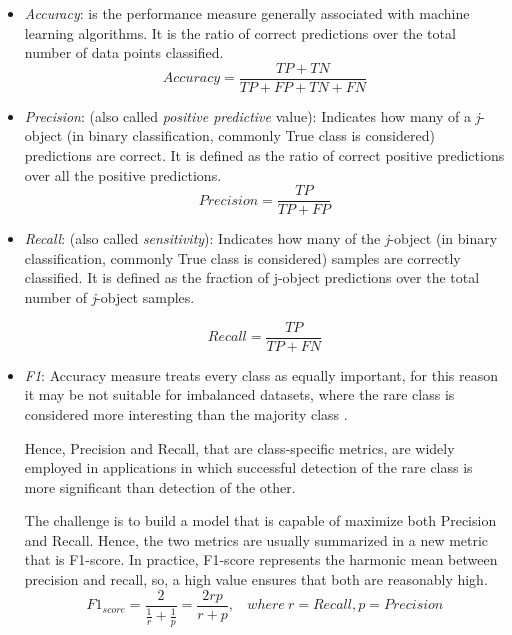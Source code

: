 \documentclass{article}
\begin{document}
\begin{itemize}
    \item \emph{Accuracy}: is the performance measure generally associated with machine learning algorithms. It is the ratio of correct predictions over the total number of data points classified. 
    \begin{equation}
    Accuracy = \frac{TP + TN}{TP + FP + TN + FN}
    \end{equation}
    
    \item \emph{Precision}: (also called \emph{positive predictive} value): Indicates how many of a \emph{j}-object (in binary classification, commonly True class is considered) predictions are correct. It is defined as the ratio of correct positive predictions over all the positive predictions.
    \begin{equation}
    Precision = \frac{TP}{TP + FP}
    \end{equation}
    
    \item \emph{Recall}: (also called \emph{sensitivity}): Indicates how many of the \emph{j}-object (in binary classification, commonly True class is considered) samples are correctly classified. It is defined as the fraction of j-object predictions over the total number of \emph{j}-object samples.
    
    \begin{equation}
    Recall = \frac{TP}{TP + FN}
    \end{equation}
    
    \item \emph{F1}: Accuracy measure treats every class as equally important, for this reason it may be not suitable for imbalanced datasets, where the rare class is considered more interesting than the majority class \cite{dodici}. 
    
    Hence, Precision and Recall, that are class-specific metrics, are widely employed in applications in which successful detection of the rare class is more significant than detection of the other.
    
    The challenge is to build a model that is capable of maximize both Precision and Recall. Hence, the two metrics are usually summarized in a new metric that is F1-score. In practice, F1-score represents the harmonic mean between precision and recall, so, a high value ensures that both are reasonably high.
    \begin{equation}
    F1_{score} = \frac{2}{\frac{1}{r}+\frac{1}{p}} = \frac{2rp}{r + p}, ~~~~ where ~ r=Recall, p=Precision
    \end{equation}
\end{itemize}
\end{document}
